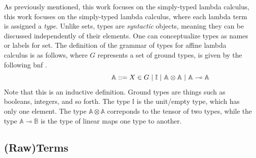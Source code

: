 As previously mentioned, this work focuses on the simply-typed lambda calculus, this work focuses on the simply-typed lambda calculus, where each lambda term is assigned a \emph{type}. Unlike sets, types are \emph{syntactic} objects, meaning they can be discussed independently of their elements. One can conceptualize types as names or labels for set. The definition of the grammar of types for affine lambda calculus is as follows, where $G$ represents a set of ground types, is given by the following \acrfull{bnf} \cite{backus1960report}.
\begin{equation} \label{eq:grammartypes}
\centering
\hspace{95pt} \mathbb{A} ::= X \in G \hspace{3 pt} \vert \hspace{3 pt} \mathbb{I}  \hspace{3 pt}  \vert \hspace{3 pt} \mathbb{A}  \otimes  \mathbb{A} \hspace{3 pt} \vert  \hspace{3 pt}  \mathbb{A} \multimap  \mathbb{A}
\end{equation}
Note that this is an inductive definition. Ground types are things such as booleans, integers, and so forth. The type $\mathbb{I}$ is the unit/empty type, which has only one element. The type $\mathbb{A} \otimes \mathbb{A}$ correponds to the tensor of two types, while the type $\mathbb{A} \multimap \mathbb{B}$ is the type of linear maps one type to another.

\subsection{(Raw)Terms}


